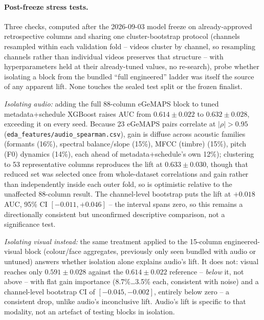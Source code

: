 \documentclass[letterpaper]{article}
\newif\ifdraft\draftfalse         %
\newcommand{\note}[2]{\ifdraft{\small\textcolor{red}{[\textbf{#1}: #2]}}\fi}
\begin{document}
\paragraph{Post-freeze stress tests.} Three checks, computed after the 2026-09-03 model freeze on already-approved retrospective columns and sharing one cluster-bootstrap protocol (channels resampled within each validation fold -- videos cluster by channel, so resampling channels rather than individual videos preserves that structure -- with hyperparameters held at their already-tuned values, no re-search), probe whether isolating a block from the bundled ``full engineered'' ladder was itself the source of any apparent lift. None touches the sealed test split or the frozen finalist.

\emph{Isolating audio:} adding the full 88-column eGeMAPS block to tuned metadata+schedule XGBoost raises AUC from $0.614\pm0.022$ to $0.632\pm0.028$, exceeding it on every seed. Because 23 eGeMAPS pairs correlate at $|\rho|>0.95$ (\texttt{eda\_features/audio\_spearman.csv}), gain is diffuse across acoustic families (formants (16\%), spectral balance/slope (15\%), MFCC (timbre) (15\%), pitch (F0) dynamics (14\%), each ahead of metadata+schedule's own 12\%); clustering to 53 representative columns reproduces the lift at $0.633\pm0.030$, though that reduced set was selected once from whole-dataset correlations and gain rather than independently inside each outer fold, so is optimistic relative to the unaffected 88-column result. The channel-level bootstrap puts the lift at $+0.018$ AUC, 95\% CI $[-0.011, +0.046]$ -- the interval spans zero, so this remains a directionally consistent but unconfirmed descriptive comparison, not a significance test. \note{PROVISIONAL}{Emmanuel + Adam, 2026-09-05: reported as a standalone post-hoc finding, not a trigger for a follow-up freeze cycle. Revisit once the prospective panel matures.}

\emph{Isolating visual instead:} the same treatment applied to the 15-column engineered-visual block (colour/face aggregates, previously only seen bundled with audio or untuned) answers whether isolation alone explains audio's lift. It does not: visual reaches only $0.591\pm0.028$ against the $0.614\pm0.022$ reference -- \emph{below} it, not above -- with flat gain importance (8.7\%\ldots3.5\% each, consistent with noise) and a channel-level bootstrap CI of $[-0.045, -0.002]$, entirely below zero -- a consistent drop, unlike audio's inconclusive lift. Audio's lift is specific to that modality, not an artefact of testing blocks in isolation.
\end{document}
